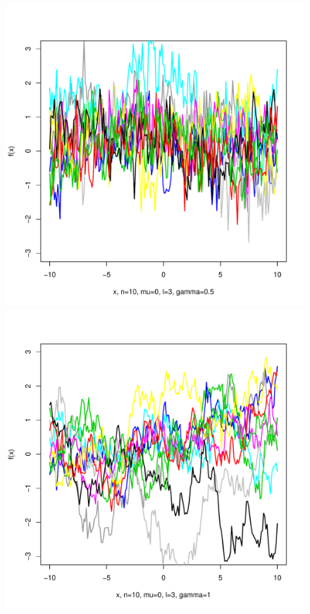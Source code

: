 \documentclass[12pt,letterpaper]{article}
\begin{document}
\begin{figure}
\begin{center}
\includegraphics[scale=0.2]{hw321/n10-m0-l3-g1.pdf}
\includegraphics[scale=0.2]{hw321/n10-m0-l3-g2.pdf}

\end{center}
\end{figure}
\end{document}
